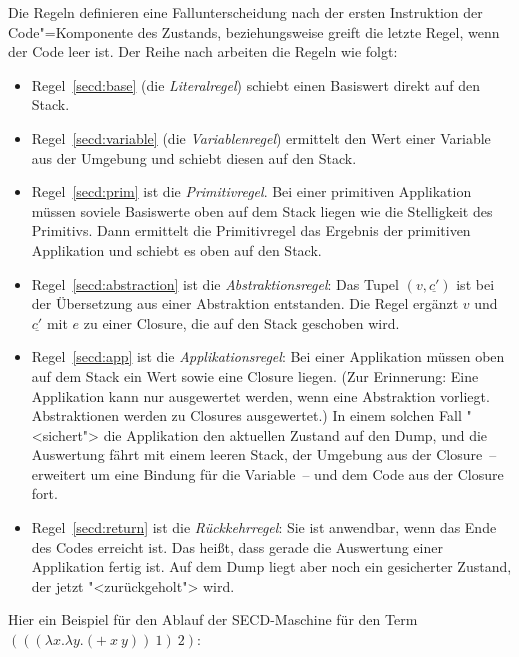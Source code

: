 %
Die Regeln definieren eine Fallunterscheidung nach der ersten
Instruktion der Code"=Komponente des Zustands, beziehungsweise greift die letzte
Regel, wenn der Code leer ist.  Der Reihe nach arbeiten die Regeln wie
folgt:
%
\begin{itemize}
\item Regel~\ref{secd:base} (die
  \textit{Literalregel}) schiebt einen Basiswert
  direkt auf den Stack.
\item Regel~\ref{secd:variable} (die
  \textit{Variablenregel}) ermittelt den Wert
  einer Variable aus der Umgebung und schiebt diesen auf den Stack.
\item Regel~\ref{secd:prim} ist die
  \textit{Primitivregel}.  Bei einer primitiven
  Applikation müssen soviele Basiswerte oben auf dem Stack liegen wie
  die Stelligkeit des Primitivs.  Dann ermittelt die Primitivregel das Ergebnis der
  primitiven Applikation und schiebt es oben auf den Stack.
\item Regel~\ref{secd:abstraction} ist die
  \textit{Abstraktionsregel}: Das Tupel
  $(v,\underline{c'})$ ist bei der Übersetzung aus einer Abstraktion
  entstanden.  Die Regel ergänzt $v$ und $\underline{c'}$ mit
  $e$ zu einer Closure, die auf den Stack geschoben wird.
\item Regel~\ref{secd:app} ist die
  \textit{Applikationsregel}: Bei einer
  Applikation müssen oben auf dem Stack ein Wert sowie eine Closure
  liegen.  (Zur Erinnerung: Eine Applikation kann nur ausgewertet
  werden, wenn eine Abstraktion vorliegt.  Abstraktionen werden zu
  Closures ausgewertet.)  In einem solchen Fall "<sichert"> die
  Applikation den aktuellen Zustand auf den Dump, und die Auswertung fährt mit
  einem leeren Stack, der Umgebung aus der Closure~-- erweitert um
  eine Bindung für die Variable~-- und dem Code aus der Closure fort.
\item Regel~\ref{secd:return} ist die
  \textit{Rückkehrregel}: Sie ist anwendbar,
  wenn das Ende des Codes erreicht ist.  Das heißt, dass gerade
  die Auswertung einer Applikation fertig ist.  Auf dem Dump liegt
  aber noch ein gesicherter Zustand, der jetzt "<zurückgeholt"> wird.
\end{itemize}
%
Hier ein Beispiel für den Ablauf der SECD-Maschine für den Term
$(((\lambda x.\lambda y.(+~x~y))~1)~2)$:
%
